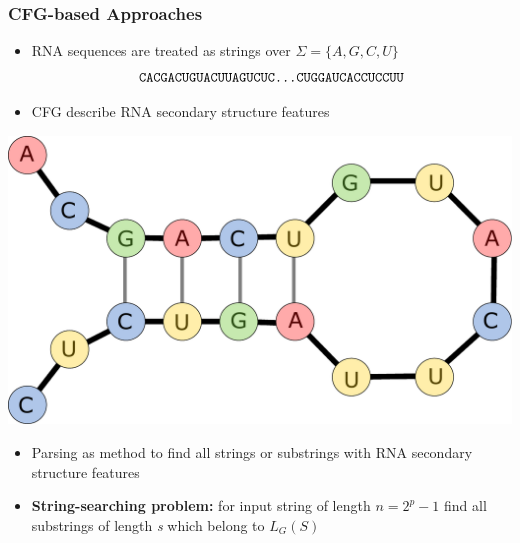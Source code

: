 \documentclass[xcolor=table]{beamer}
\begin{document}
\begin{frame}[fragile] \frametitle{CFG-based Approaches}

    \begin{itemize}
        \item RNA sequences are treated as strings over $\Sigma = \{A, G, C, U\}$
        $$
        \texttt{CACGACUGUACUUAGUCUC\dots CUGGAUCACCUCCUU}
        $$
        \item CFG describe RNA secondary structure features
    \end{itemize}
        \begin{figure}[t]
        \end{figure}

        \vspace{-100}\hspace{30}\includegraphics[width = 0.4\linewidth]{pic/16s.pdf}\par 
        
        \begin{itemize}
            \item Parsing as method to find all strings or substrings with RNA secondary structure features
            \item \textbf{String-searching problem:} for input string of length $n = 2^p - 1$ find all substrings of length \textit{s} which belong to $L_G(S)$
        \end{itemize}

\end{frame}
\end{document}

